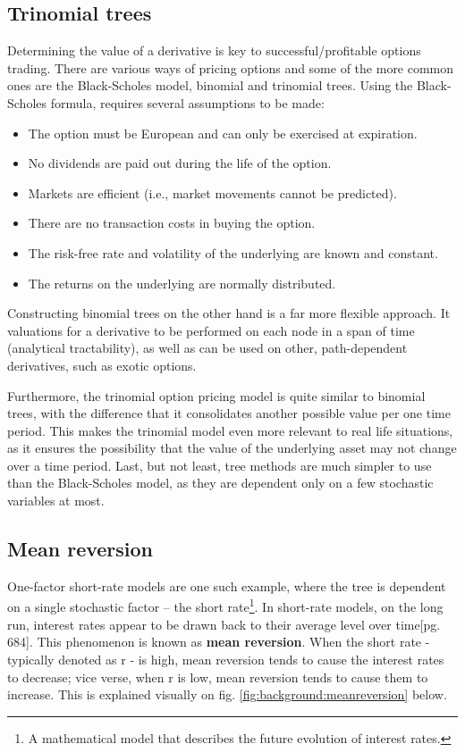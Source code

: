 \subsection{Trinomial trees}
Determining the value of a derivative is key to successful/profitable options trading. There are various ways of pricing options and some of the more common ones are the Black-Scholes model\cite{blackscholes}, binomial and trinomial trees. Using the Black-Scholes formula, requires several assumptions to be made: 
\begin{itemize}
    \item The option must be European and can only be exercised at expiration.
    \item No dividends are paid out during the life of the option.
    \item Markets are efficient (i.e., market movements cannot be predicted).
    \item There are no transaction costs in buying the option.
    \item The risk-free rate and volatility of the underlying are known and constant.
    \item The returns on the underlying are normally distributed.
\end{itemize}
Constructing binomial trees on the other hand is a far more flexible approach. It valuations for a derivative to be performed on each node in a span of time (analytical tractability), as well as can be used on other, path-dependent derivatives, such as exotic options. 

Furthermore, the trinomial option pricing model is quite similar to binomial trees, with the difference that it consolidates another possible value per one time period. This makes the trinomial model even more relevant to real life situations, as it ensures the possibility that the value of the underlying asset may not change over a time period. Last, but not least, tree methods are much simpler to use than the Black-Scholes model, as they are dependent only on a few stochastic variables at most.

\subsection{Mean reversion}
One-factor short-rate models are one such example, where the tree is dependent on a single stochastic factor – the short rate\footnote{A mathematical model that describes the future evolution of interest rates.}. In short-rate models, on the long run, interest rates appear to be drawn back to their average level over time\cite{ofod}[pg. 684]. This phenomenon is known as \textbf{mean reversion}. When the short rate - typically denoted as r - is high, mean reversion tends to cause the interest rates to decrease; vice verse, when r is low, mean reversion tends to cause them to increase. This is explained visually on fig. \ref{fig:background:meanreversion} below. 

